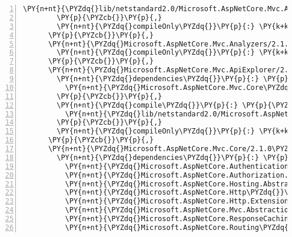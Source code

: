 \begin{Verbatim}[commandchars=\\\{\},numbers=left,firstnumber=1,stepnumber=1,numberblanklines=0]
          \PY{n+nt}{\PYZdq{}lib/netstandard2.0/Microsoft.AspNetCore.Mvc.Abstractions.dll\PYZdq{}}\PY{p}{:} \PY{p}{\PYZob{}}\PY{p}{\PYZcb{}}
        \PY{p}{\PYZcb{}}\PY{p}{,}
        \PY{n+nt}{\PYZdq{}compileOnly\PYZdq{}}\PY{p}{:} \PY{k+kc}{true}
      \PY{p}{\PYZcb{}}\PY{p}{,}
      \PY{n+nt}{\PYZdq{}Microsoft.AspNetCore.Mvc.Analyzers/2.1.0\PYZhy{}rc1\PYZhy{}final\PYZdq{}}\PY{p}{:} \PY{p}{\PYZob{}}
        \PY{n+nt}{\PYZdq{}compileOnly\PYZdq{}}\PY{p}{:} \PY{k+kc}{true}
      \PY{p}{\PYZcb{}}\PY{p}{,}
      \PY{n+nt}{\PYZdq{}Microsoft.AspNetCore.Mvc.ApiExplorer/2.1.0\PYZhy{}rc1\PYZhy{}final\PYZdq{}}\PY{p}{:} \PY{p}{\PYZob{}}
        \PY{n+nt}{\PYZdq{}dependencies\PYZdq{}}\PY{p}{:} \PY{p}{\PYZob{}}
          \PY{n+nt}{\PYZdq{}Microsoft.AspNetCore.Mvc.Core\PYZdq{}}\PY{p}{:} \PY{l+s+s2}{\PYZdq{}2.1.0\PYZhy{}rc1\PYZhy{}final\PYZdq{}}
        \PY{p}{\PYZcb{}}\PY{p}{,}
        \PY{n+nt}{\PYZdq{}compile\PYZdq{}}\PY{p}{:} \PY{p}{\PYZob{}}
          \PY{n+nt}{\PYZdq{}lib/netstandard2.0/Microsoft.AspNetCore.Mvc.ApiExplorer.dll\PYZdq{}}\PY{p}{:} \PY{p}{\PYZob{}}\PY{p}{\PYZcb{}}
        \PY{p}{\PYZcb{}}\PY{p}{,}
        \PY{n+nt}{\PYZdq{}compileOnly\PYZdq{}}\PY{p}{:} \PY{k+kc}{true}
      \PY{p}{\PYZcb{}}\PY{p}{,}
      \PY{n+nt}{\PYZdq{}Microsoft.AspNetCore.Mvc.Core/2.1.0\PYZhy{}rc1\PYZhy{}final\PYZdq{}}\PY{p}{:} \PY{p}{\PYZob{}}
        \PY{n+nt}{\PYZdq{}dependencies\PYZdq{}}\PY{p}{:} \PY{p}{\PYZob{}}
          \PY{n+nt}{\PYZdq{}Microsoft.AspNetCore.Authentication.Core\PYZdq{}}\PY{p}{:} \PY{l+s+s2}{\PYZdq{}2.1.0\PYZhy{}rc1\PYZhy{}final\PYZdq{}}\PY{p}{,}
          \PY{n+nt}{\PYZdq{}Microsoft.AspNetCore.Authorization.Policy\PYZdq{}}\PY{p}{:} \PY{l+s+s2}{\PYZdq{}2.1.0\PYZhy{}rc1\PYZhy{}final\PYZdq{}}\PY{p}{,}
          \PY{n+nt}{\PYZdq{}Microsoft.AspNetCore.Hosting.Abstractions\PYZdq{}}\PY{p}{:} \PY{l+s+s2}{\PYZdq{}2.1.0\PYZhy{}rc1\PYZhy{}final\PYZdq{}}\PY{p}{,}
          \PY{n+nt}{\PYZdq{}Microsoft.AspNetCore.Http\PYZdq{}}\PY{p}{:} \PY{l+s+s2}{\PYZdq{}2.1.0\PYZhy{}rc1\PYZhy{}final\PYZdq{}}\PY{p}{,}
          \PY{n+nt}{\PYZdq{}Microsoft.AspNetCore.Http.Extensions\PYZdq{}}\PY{p}{:} \PY{l+s+s2}{\PYZdq{}2.1.0\PYZhy{}rc1\PYZhy{}final\PYZdq{}}\PY{p}{,}
          \PY{n+nt}{\PYZdq{}Microsoft.AspNetCore.Mvc.Abstractions\PYZdq{}}\PY{p}{:} \PY{l+s+s2}{\PYZdq{}2.1.0\PYZhy{}rc1\PYZhy{}final\PYZdq{}}\PY{p}{,}
          \PY{n+nt}{\PYZdq{}Microsoft.AspNetCore.ResponseCaching.Abstractions\PYZdq{}}\PY{p}{:} \PY{l+s+s2}{\PYZdq{}2.1.0\PYZhy{}rc1\PYZhy{}final\PYZdq{}}\PY{p}{,}
          \PY{n+nt}{\PYZdq{}Microsoft.AspNetCore.Routing\PYZdq{}}\PY{p}{:} \PY{l+s+s2}{\PYZdq{}2.1.0\PYZhy{}rc1\PYZhy{}final\PYZdq{}}\PY{p}{,}

\end{Verbatim}

